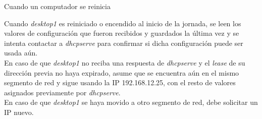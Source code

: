 \begin{frame}{Cuando un computador se reinicia} 

    Cuando \textit{desktop1} es reiniciado o encendido al inicio de la jornada,
    se leen los valores de configuración que fueron recibidos y guardados la
    última vez y se intenta contactar a \textit{dhcpserve} para confirmar si
    dicha configuración puede ser usada aún.\\[0,2cm]
    
    En caso de que \textit{desktop1} no reciba una respuesta de
    \textit{dhcpserve} y el \textit{lease} de su dirección previa no haya
    expirado, asume que se encuentra aún en el mismo segmento de red y sigue
    usando la IP 192.168.12.25, con el resto de valores asignados previamente
    por \textit{dhcpserve}.\\[0.2cm]

    En caso de que \textit{desktop1} se haya movido a otro segmento de red, debe
    solicitar un IP nuevo.\\[0.2cm]

\end{frame}


